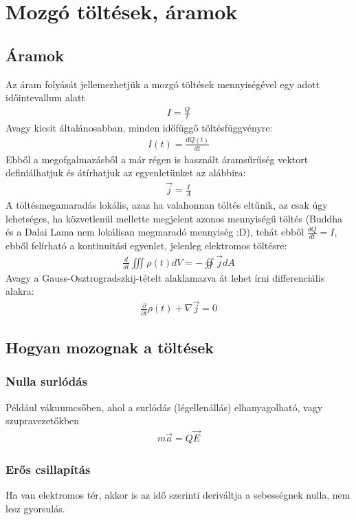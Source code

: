 \documentclass{article}
\begin{document}
\section{Mozgó töltések, áramok}
\subsection{Áramok}
Az áram folyását jellemezhetjük a mozgó töltések mennyiségével egy adott időintevallum alatt
\begin{gather*}
I=\frac{Q}{t}
\end{gather*}
Avagy kicsit általánosabban, minden időfüggő töltésfüggvényre:
\begin{gather*}
I(t) = \frac{dQ(t)}{dt}
\end{gather*}
Ebből a megofgalmazásből a már régen is használt áramsűrűség vektort definiálhatjuk és átírhatjuk az egyenletünket az alábbira:
\begin{gather*}
\vec{j} = \frac{I}{A}
\end{gather*}
A töltésmegamaradás lokális, azaz ha valahonnan töltés eltűnik, az csak úgy lehetséges, ha közvetlenül mellette megjelent azonos mennyiségű töltés (Buddha és a Dalai Lama nem lokálisan megmaradó mennyiség :D), tehát ebből $\frac{dQ}{dt} = I$, ebből felírható a kontinuitási egyenlet, jelenleg elektromos töltésre:
\begin{gather*}
\frac{d}{dt}\iiint \rho(t) dV = - \oiint \vec{j} dA 
\end{gather*}
Avagy a Gauss-Osztrogradszkij-tételt alaklamazva át lehet írni differenciális alakra:
\begin{gather*}
\frac{\partial}{\partial t} \rho(t) + \nabla \vec{j} = 0
\end{gather*}
\subsection{Hogyan mozognak a töltések}
\subsubsection{Nulla surlódás}
Például vákuumcsőben, ahol a surlódás (légellenállás) elhanyagolható, vagy szupravezetőkben
\begin{gather*}
m \vec{a} = Q \vec{E}
\end{gather*}
\subsubsection{Erős csillapítás}
Ha van elektromos tér, akkor is az idő szerinti deriváltja a sebességnek nulla, nem lesz gyorsulás.
\end{document}
